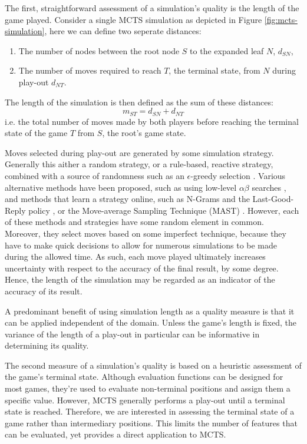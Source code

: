 \documentclass{ecai2010}
\begin{document}
The first, straightforward assessment of a simulation's quality is the length of the game played. Consider a single MCTS simulation as depicted in Figure \ref{fig:mcts-simulation}, here we can define two seperate distances: 
\begin{enumerate}
\item The number of nodes between the root node $S$ to the expanded leaf $N$, $d_{SN}$,
\item The number of moves required to reach $T$, the terminal state, from $N$ during play-out $d_{NT}$.
\end{enumerate}
The length of the simulation is then defined as the sum of these distances:
\begin{equation}
m_{ST} = d_{SN} + d_{NT}
\label{eq:m_ST}
\end{equation}
i.e. the total number of moves made by both players before reaching the terminal state of the game $T$ from $S$, the root's game state.

Moves selected during play-out are generated by some simulation strategy. Generally this aither a  random strategy, or a rule-based, reactive strategy, combined with a source of randomness such as an $\epsilon$-greedy selection \cite{sutton1998reinforcement, sturtevant2008analysis}. Various alternative methods have been proposed, such as using low-level $\alpha\beta$ searches \cite{winands2011a}, and methods that learn a strategy online, such as N-Grams and the Last-Good-Reply policy \cite{Tak2012}, or the Move-average Sampling Technique (MAST) \cite{finnsson2010learning}. However, each of these methods and strategies have some random element in common. Moreover, they select moves based on some imperfect technique, because they have to make quick decisions to allow for numerous simulations to be made during the allowed time. As such, each move played ultimately increases uncertainty with respect to the accuracy of the final result, by some degree. Hence, the length of the simulation may be regarded as an indicator of the accuracy of its result.

A predominant benefit of using simulation length as a quality measure is that it can be applied independent of the domain. Unless the game's length is fixed, the variance of the length of a play-out in particular can be informative in determining its quality.

The second measure of a simulation's quality is based on a heuristic assessment of the game's terminal state. Although evaluation functions can be designed for most games, they're used to evaluate non-terminal positions and assign them a specific value. However, MCTS generally performs a play-out until a terminal state is reached. Therefore, we are interested in assessing the terminal state of a game rather than intermediary positions. This limits the number of features that can be evaluated, yet provides a direct application to MCTS.
\end{document}
